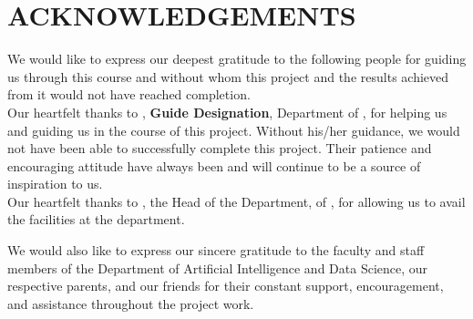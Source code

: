 \clearpage
{}
{}
\chapter*{ACKNOWLEDGEMENTS}

\noindent
\fontsize{12pt}{18pt}\selectfont We would like to express our deepest gratitude to the following people for guiding us through this course and without whom this project and the results achieved from it would not have reached completion.\\

\noindent
Our heartfelt thanks to \textbf{\thesisguide}, \textbf{Guide Designation}, Department of \thesisdept, for helping us and guiding us in the course of this project. Without his/her guidance, we would not have been able to successfully complete this project. Their patience and encouraging attitude have always been and will continue to be a source of inspiration to us.\\

\noindent
Our heartfelt thanks to \textbf{\depthod}, the Head of the Department,  of \thesisdept, for allowing us to avail the facilities at the department.\\

\noindent

We would also like to express our sincere gratitude to the faculty and staff members of the Department of Artificial Intelligence and Data Science, our respective parents, and our friends for their constant support, encouragement, and assistance throughout the project work.

